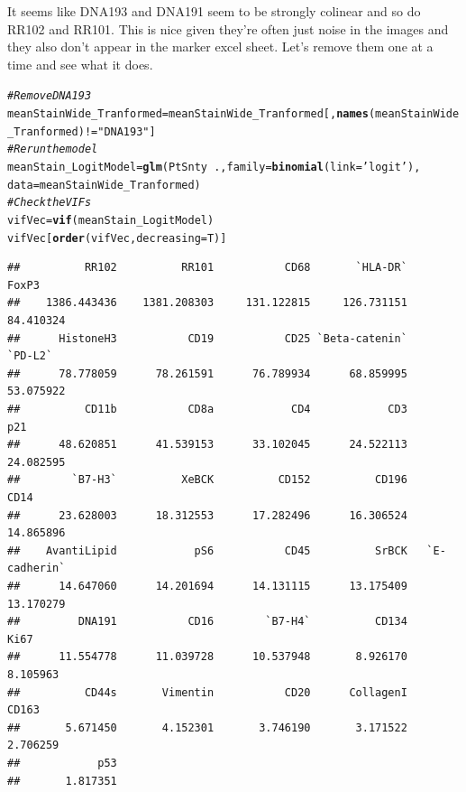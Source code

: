 \documentclass[a4paper]{article}\usepackage[]{graphicx}\usepackage[]{color}
\makeatletter
\newcommand{\hlstr}[1]{\textcolor[rgb]{0.192,0.494,0.8}{#1}}%
\newcommand{\hlcom}[1]{\textcolor[rgb]{0.678,0.584,0.686}{\textit{#1}}}%
\newcommand{\hlopt}[1]{\textcolor[rgb]{0,0,0}{#1}}%
\newcommand{\hlstd}[1]{\textcolor[rgb]{0.345,0.345,0.345}{#1}}%
\newcommand{\hlkwb}[1]{\textcolor[rgb]{0.69,0.353,0.396}{#1}}%
\newcommand{\hlkwc}[1]{\textcolor[rgb]{0.333,0.667,0.333}{#1}}%
\newcommand{\hlkwd}[1]{\textcolor[rgb]{0.737,0.353,0.396}{\textbf{#1}}}%
\newenvironment{kframe}{%
 \def\at@end@of@kframe{}%
 \ifinner\ifhmode%
  \def\at@end@of@kframe{\end{minipage}}%
  \begin{minipage}{\columnwidth}%
 \fi\fi%
 \def\FrameCommand##1{\hskip\@totalleftmargin \hskip-\fboxsep
 \colorbox{shadecolor}{##1}\hskip-\fboxsep
     \hskip-\linewidth \hskip-\@totalleftmargin \hskip\columnwidth}%
 \MakeFramed {\advance\hsize-\width
   \@totalleftmargin\z@ \linewidth\hsize
   \@setminipage}}%
 {\par\unskip\endMakeFramed%
 \at@end@of@kframe}
\newenvironment{knitrout}{}{} %
\makeatother
\begin{document}
It seems like DNA193 and DNA191 seem to be strongly colinear and so do RR102 and RR101. This is nice given they're often just noise in the images and they also don't appear in the marker excel sheet. Let's remove them one at a time and see what it does.
\begin{knitrout}
\color{fgcolor}\begin{kframe}
\begin{alltt}
\hlcom{# Remove DNA193}
\hlstd{meanStainWide_Tranformed} \hlkwb{=} \hlstd{meanStainWide_Tranformed[,}\hlkwd{names}\hlstd{(meanStainWide_Tranformed)}\hlopt{!=}\hlstr{"DNA193"}\hlstd{]}
\hlcom{# Rerun the model}
\hlstd{meanStain_LogitModel} \hlkwb{=} \hlkwd{glm}\hlstd{(PtSnty} \hlopt{~}\hlstd{.,}\hlkwc{family}\hlstd{=}\hlkwd{binomial}\hlstd{(}\hlkwc{link}\hlstd{=}\hlstr{'logit'}\hlstd{),}
                           \hlkwc{data}\hlstd{=meanStainWide_Tranformed)}
\hlcom{# Check the VIFs}
\hlstd{vifVec} \hlkwb{=} \hlkwd{vif}\hlstd{(meanStain_LogitModel)}
\hlstd{vifVec[}\hlkwd{order}\hlstd{(vifVec,}\hlkwc{decreasing}\hlstd{=T)]}
\end{alltt}
\begin{verbatim}
##          RR102          RR101           CD68       `HLA-DR`          FoxP3 
##    1386.443436    1381.208303     131.122815     126.731151      84.410324 
##      HistoneH3           CD19           CD25 `Beta-catenin`        `PD-L2` 
##      78.778059      78.261591      76.789934      68.859995      53.075922 
##          CD11b           CD8a            CD4            CD3            p21 
##      48.620851      41.539153      33.102045      24.522113      24.082595 
##        `B7-H3`          XeBCK          CD152          CD196           CD14 
##      23.628003      18.312553      17.282496      16.306524      14.865896 
##    AvantiLipid            pS6           CD45          SrBCK   `E-cadherin` 
##      14.647060      14.201694      14.131115      13.175409      13.170279 
##         DNA191           CD16        `B7-H4`          CD134           Ki67 
##      11.554778      11.039728      10.537948       8.926170       8.105963 
##          CD44s       Vimentin           CD20      CollagenI          CD163 
##       5.671450       4.152301       3.746190       3.171522       2.706259 
##            p53 
##       1.817351
\end{verbatim}
\end{kframe}
\end{knitrout}
\end{document}
